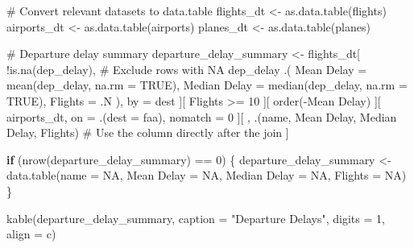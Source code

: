 \documentclass[
  12pt,
]{article}
\newenvironment{Shaded}{\begin{snugshade}}{\end{snugshade}}
\newcommand{\AttributeTok}[1]{\textcolor[rgb]{0.40,0.45,0.13}{#1}}
\newcommand{\CommentTok}[1]{\textcolor[rgb]{0.37,0.37,0.37}{#1}}
\newcommand{\ConstantTok}[1]{\textcolor[rgb]{0.56,0.35,0.01}{#1}}
\newcommand{\ControlFlowTok}[1]{\textcolor[rgb]{0.00,0.23,0.31}{\textbf{#1}}}
\newcommand{\DecValTok}[1]{\textcolor[rgb]{0.68,0.00,0.00}{#1}}
\newcommand{\FunctionTok}[1]{\textcolor[rgb]{0.28,0.35,0.67}{#1}}
\newcommand{\NormalTok}[1]{\textcolor[rgb]{0.00,0.23,0.31}{#1}}
\newcommand{\OtherTok}[1]{\textcolor[rgb]{0.00,0.23,0.31}{#1}}
\newcommand{\SpecialCharTok}[1]{\textcolor[rgb]{0.37,0.37,0.37}{#1}}
\newcommand{\StringTok}[1]{\textcolor[rgb]{0.13,0.47,0.30}{#1}}
\begin{document}
\begin{Shaded}
\begin{Highlighting}[]
\CommentTok{\# Convert relevant datasets to data.table}
\NormalTok{flights\_dt }\OtherTok{\textless{}{-}} \FunctionTok{as.data.table}\NormalTok{(flights)}
\NormalTok{airports\_dt }\OtherTok{\textless{}{-}} \FunctionTok{as.data.table}\NormalTok{(airports)}
\NormalTok{planes\_dt }\OtherTok{\textless{}{-}} \FunctionTok{as.data.table}\NormalTok{(planes)}

\CommentTok{\# Departure delay summary}
\NormalTok{departure\_delay\_summary }\OtherTok{\textless{}{-}}\NormalTok{ flights\_dt[}
  \SpecialCharTok{!}\FunctionTok{is.na}\NormalTok{(dep\_delay), }\CommentTok{\# Exclude rows with NA dep\_delay}
\NormalTok{  .(}
    \StringTok{\textasciigrave{}}\AttributeTok{Mean Delay}\StringTok{\textasciigrave{}} \OtherTok{=} \FunctionTok{mean}\NormalTok{(dep\_delay, }\AttributeTok{na.rm =} \ConstantTok{TRUE}\NormalTok{),}
    \StringTok{\textasciigrave{}}\AttributeTok{Median Delay}\StringTok{\textasciigrave{}} \OtherTok{=} \FunctionTok{median}\NormalTok{(dep\_delay, }\AttributeTok{na.rm =} \ConstantTok{TRUE}\NormalTok{),}
    \AttributeTok{Flights =}\NormalTok{ .N}
\NormalTok{  ), by }\OtherTok{=}\NormalTok{ dest}
\NormalTok{][}
\NormalTok{  Flights }\SpecialCharTok{\textgreater{}=} \DecValTok{10}
\NormalTok{][}
  \FunctionTok{order}\NormalTok{(}\SpecialCharTok{{-}}\StringTok{\textasciigrave{}}\AttributeTok{Mean Delay}\StringTok{\textasciigrave{}}\NormalTok{)}
\NormalTok{][}
\NormalTok{  airports\_dt, on }\OtherTok{=}\NormalTok{ .(}\AttributeTok{dest =}\NormalTok{ faa), nomatch }\OtherTok{=} \DecValTok{0}
\NormalTok{][}
\NormalTok{  , .(name, }\StringTok{\textasciigrave{}}\AttributeTok{Mean Delay}\StringTok{\textasciigrave{}}\NormalTok{, }\StringTok{\textasciigrave{}}\AttributeTok{Median Delay}\StringTok{\textasciigrave{}}\NormalTok{, Flights) }\CommentTok{\# Use the column directly after the join}
\NormalTok{]}

\ControlFlowTok{if}\NormalTok{ (}\FunctionTok{nrow}\NormalTok{(departure\_delay\_summary) }\SpecialCharTok{==} \DecValTok{0}\NormalTok{) \{}
\NormalTok{  departure\_delay\_summary }\OtherTok{\textless{}{-}} \FunctionTok{data.table}\NormalTok{(}\AttributeTok{name =} \ConstantTok{NA}\NormalTok{, }\StringTok{\textasciigrave{}}\AttributeTok{Mean Delay}\StringTok{\textasciigrave{}} \OtherTok{=} \ConstantTok{NA}\NormalTok{, }\StringTok{\textasciigrave{}}\AttributeTok{Median Delay}\StringTok{\textasciigrave{}} \OtherTok{=} \ConstantTok{NA}\NormalTok{, }\AttributeTok{Flights =} \ConstantTok{NA}\NormalTok{)}
\NormalTok{\}}

\FunctionTok{kable}\NormalTok{(departure\_delay\_summary, }\AttributeTok{caption =} \StringTok{"Departure Delays"}\NormalTok{, }\AttributeTok{digits =} \DecValTok{1}\NormalTok{, }\AttributeTok{align =} \StringTok{\textquotesingle{}c\textquotesingle{}}\NormalTok{)}
\end{Highlighting}
\end{Shaded}
\end{document}

